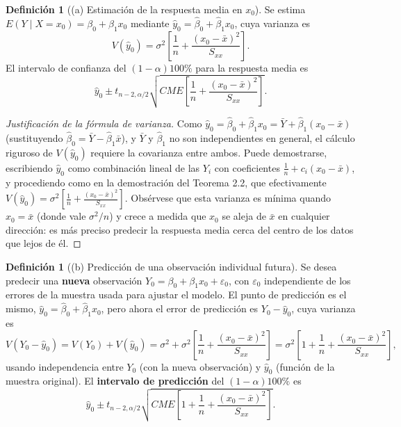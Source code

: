 \documentclass[11pt,a4paper]{article}
\theoremstyle{plain}
\theoremstyle{definition}
\newtheorem{definicion}[teorema]{Definición}
\theoremstyle{remark}
\begin{document}
\begin{definicion}[(a) Estimación de la respuesta media en $x_0$]
Se estima $E(Y\mid X=x_0)=\beta_0+\beta_1x_0$ mediante $\hat y_0=\hat\beta_0+\hat\beta_1x_0$, cuya varianza es
\[
V(\hat y_0) = \sigma^2\left[\frac1n+\frac{(x_0-\bar x)^2}{S_{xx}}\right].
\]
El intervalo de confianza del $(1-\alpha)100\%$ para la respuesta media es
\[
\hat y_0 \pm t_{n-2,\alpha/2}\sqrt{CME\left[\frac1n+\frac{(x_0-\bar x)^2}{S_{xx}}\right]}.
\]
\end{definicion}

\begin{proof}[Justificación de la fórmula de varianza]
Como $\hat y_0=\hat\beta_0+\hat\beta_1x_0 = \bar Y+\hat\beta_1(x_0-\bar x)$ (sustituyendo $\hat\beta_0=\bar Y-\hat\beta_1\bar x$), y $\bar Y$ y $\hat\beta_1$ no son independientes en general, el cálculo riguroso de $V(\hat y_0)$ requiere la covarianza entre ambos. Puede demostrarse, escribiendo $\hat y_0$ como combinación lineal de las $Y_i$ con coeficientes $\frac1n+c_i(x_0-\bar x)$, y procediendo como en la demostración del Teorema 2.2, que efectivamente $V(\hat y_0)=\sigma^2\left[\frac1n+\frac{(x_0-\bar x)^2}{S_{xx}}\right]$. Obsérvese que esta varianza es mínima quando $x_0=\bar x$ (donde vale $\sigma^2/n$) y crece a medida que $x_0$ se aleja de $\bar x$ en cualquier dirección: es más preciso predecir la respuesta media cerca del centro de los datos que lejos de él.
\end{proof}

\begin{definicion}[(b) Predicción de una observación individual futura]
Se desea predecir una \textbf{nueva} observación $Y_0=\beta_0+\beta_1x_0+\varepsilon_0$, con $\varepsilon_0$ independiente de los errores de la muestra usada para ajustar el modelo. El punto de predicción es el mismo, $\hat y_0=\hat\beta_0+\hat\beta_1x_0$, pero ahora el error de predicción es $Y_0-\hat y_0$, cuya varianza es
\[
V(Y_0-\hat y_0) = V(Y_0)+V(\hat y_0) = \sigma^2+\sigma^2\left[\frac1n+\frac{(x_0-\bar x)^2}{S_{xx}}\right] = \sigma^2\left[1+\frac1n+\frac{(x_0-\bar x)^2}{S_{xx}}\right],
\]
usando independencia entre $Y_0$ (con la nueva observación) y $\hat y_0$ (función de la muestra original). El \textbf{intervalo de predicción} del $(1-\alpha)100\%$ es
\[
\hat y_0 \pm t_{n-2,\alpha/2}\sqrt{CME\left[1+\frac1n+\frac{(x_0-\bar x)^2}{S_{xx}}\right]}.
\]
\end{definicion}
\end{document}
